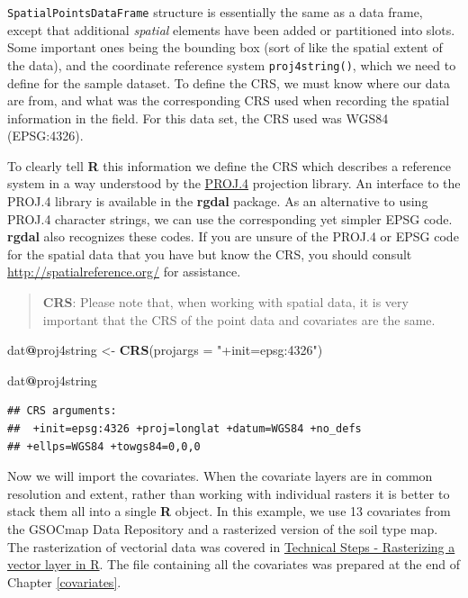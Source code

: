 \documentclass[10pt,b5paper,]{book}
\newenvironment{Shaded}{\begin{snugshade}}{\end{snugshade}}
\newcommand{\DataTypeTok}[1]{\textcolor[rgb]{0.13,0.29,0.53}{#1}}
\newcommand{\KeywordTok}[1]{\textcolor[rgb]{0.13,0.29,0.53}{\textbf{#1}}}
\newcommand{\NormalTok}[1]{#1}
\newcommand{\OperatorTok}[1]{\textcolor[rgb]{0.81,0.36,0.00}{\textbf{#1}}}
\newcommand{\StringTok}[1]{\textcolor[rgb]{0.31,0.60,0.02}{#1}}
\theoremstyle{definition}
\theoremstyle{definition}
\theoremstyle{definition}
\theoremstyle{remark}
\begin{document}
\texttt{SpatialPointsDataFrame} structure is essentially the same as a
data frame, except that additional \emph{spatial} elements have been
added or partitioned into slots. Some important ones being the bounding
box (sort of like the spatial extent of the data), and the coordinate
reference system \texttt{proj4string()}, which we need to define for the
sample dataset. To define the CRS, we must know where our data are from,
and what was the corresponding CRS used when recording the spatial
information in the field. For this data set, the CRS used was WGS84
(EPSG:4326).

To clearly tell \textbf{R} this information we define the CRS which
describes a reference system in a way understood by the
\href{http://trac.osgeo.org/proj/}{PROJ.4} projection library. An
interface to the PROJ.4 library is available in the \textbf{rgdal}
package. As an alternative to using PROJ.4 character strings, we can use
the corresponding yet simpler EPSG code. \textbf{rgdal} also recognizes
these codes. If you are unsure of the PROJ.4 or EPSG code for the
spatial data that you have but know the CRS, you should consult
\url{http://spatialreference.org/} for assistance.

\begin{quote}
\textbf{CRS}: Please note that, when working with spatial data, it is
very important that the CRS of the point data and covariates are the
same.
\end{quote}

\begin{Shaded}
\begin{Highlighting}[]
\NormalTok{dat}\OperatorTok{@}\NormalTok{proj4string <-}\StringTok{ }\KeywordTok{CRS}\NormalTok{(}\DataTypeTok{projargs =} \StringTok{"+init=epsg:4326"}\NormalTok{)}

\NormalTok{dat}\OperatorTok{@}\NormalTok{proj4string}
\end{Highlighting}
\end{Shaded}

\begin{verbatim}
## CRS arguments:
##  +init=epsg:4326 +proj=longlat +datum=WGS84 +no_defs
## +ellps=WGS84 +towgs84=0,0,0
\end{verbatim}

Now we will import the covariates. When the covariate layers are in
common resolution and extent, rather than working with individual
rasters it is better to stack them all into a single \textbf{R} object.
In this example, we use 13 covariates from the GSOCmap Data Repository
and a rasterized version of the soil type map. The rasterization of
vectorial data was covered in
\protect\hyperlink{technical-steps---rasterizing-a-vector-layer-in-r}{Technical
Steps - Rasterizing a vector layer in R}. The file containing all the
covariates was prepared at the end of Chapter \ref{covariates}.
\end{document}
